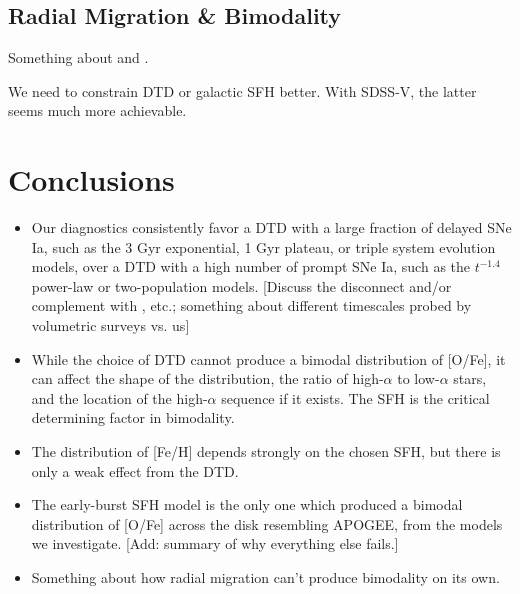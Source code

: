 \documentclass[twocolumn,twocolappendix,linenumbers]{aastex631}
\begin{document}
\subsection{Radial Migration \& Bimodality}

Something about \citet{Johnson2021-Migration} and \citet{Schonrich2009-RadialMixing}.

We need to constrain DTD or galactic SFH better. With SDSS-V, the latter seems much more achievable.

\section{Conclusions}
\label{sec:conclusions}

\begin{itemize}

    \item Our diagnostics consistently favor a DTD with a large fraction of delayed SNe Ia, such as the 3 Gyr exponential, 1 Gyr plateau, or triple system evolution models, over a DTD with a high number of prompt SNe Ia, such as the $t^{-1.4}$ power-law or two-population models. [Discuss the disconnect and/or complement with \citet{Maoz2017-CosmicDTD}, etc.; something about different timescales probed by volumetric surveys vs. us]
    
    \item While the choice of DTD cannot produce a bimodal distribution of [O/Fe], it can affect the shape of the distribution, the ratio of high-$\alpha$ to low-$\alpha$ stars, and the location of the high-$\alpha$ sequence if it exists. The SFH is the critical determining factor in bimodality.

    \item The distribution of [Fe/H] depends strongly on the chosen SFH, but there is only a weak effect from the DTD.

    \item The early-burst SFH model is the only one which produced a bimodal distribution of [O/Fe] across the disk resembling APOGEE, from the models we investigate. [Add: summary of why everything else fails.]

    \item Something about how radial migration can't produce bimodality on its own.
    
\end{itemize}
\end{document}
